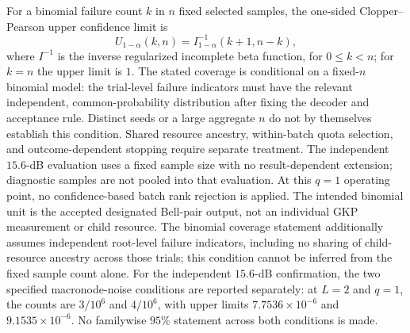 \documentclass[aps,
prx,
superscriptaddress,
reprint,
longbibliography,
floatfix]{revtex4-2}
\begin{document}
For a binomial failure count $k$ in $n$ fixed selected samples, the one-sided Clopper--Pearson upper confidence limit is
\begin{equation}
U_{1-\alpha}(k,n)=I^{-1}_{1-\alpha}(k+1,n-k),
\label{eq:cp_upper}
\end{equation}
where $I^{-1}$ is the inverse regularized incomplete beta function, for $0\le k<n$; for $k=n$ the upper limit is $1$. The stated coverage is conditional on a fixed-$n$ binomial model: the trial-level failure indicators must have the relevant independent, common-probability distribution after fixing the decoder and acceptance rule. Distinct seeds or a large aggregate $n$ do not by themselves establish this condition. Shared resource ancestry, within-batch quota selection, and outcome-dependent stopping require separate treatment. The independent $15.6$-dB evaluation uses a fixed sample size with no result-dependent extension; diagnostic samples are not pooled into that evaluation. At this $q=1$ operating point, no confidence-based batch rank rejection is applied. The intended binomial unit is the accepted designated Bell-pair output, not an individual GKP measurement or child resource. The binomial coverage statement additionally assumes independent root-level failure indicators, including no sharing of child-resource ancestry across those trials; this condition cannot be inferred from the fixed sample count alone. For the independent $15.6$-dB confirmation, the two specified macronode-noise conditions are reported separately: at $L=2$ and $q=1$, the counts are $3/10^6$ and $4/10^6$, with upper limits $7.7536\times10^{-6}$ and $9.1535\times10^{-6}$. No familywise $95\%$ statement across both conditions is made.
\end{document}

